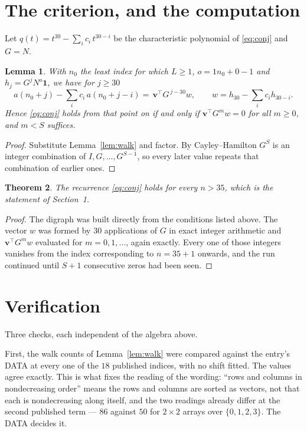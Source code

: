 \documentclass[11pt,a4paper]{article}
\theoremstyle{plain}
\newtheorem{theorem}{Theorem}
\newtheorem{lemma}[theorem]{Lemma}
\theoremstyle{definition}
\begin{document}
\section{The criterion, and the computation}

Let $q(t)=t^{30}-\sum_i c_i\,t^{30-i}$ be the characteristic polynomial of
\eqref{eq:conj} and $G=N$.

\begin{lemma}\label{lem:crit}
With $n_0$ the least index for which $L\ge1$, $o=1n_0+0-1$ and
$h_j=G^{j}N^{o}\mathbf{1}$, we have for $j\ge30$
\[
a(n_0+j)-\sum_i c_i\,a(n_0+j-i)=\,\mathbf{v}^{\!\top}G^{\,j-30}w,
\qquad w=h_{30}-\sum_i c_ih_{30-i} .
\]
Hence \eqref{eq:conj} holds from that point on if and only if
$\mathbf{v}^{\!\top}G^{m}w=0$ for all $m\ge0$, and $m<S$ suffices.
\end{lemma}

\begin{proof}
Substitute Lemma~\ref{lem:walk} and factor. By Cayley--Hamilton $G^{S}$ is an integer
combination of $I,G,\dots,G^{S-1}$, so every later value repeats that combination of
earlier ones.
\end{proof}

\begin{theorem}
The recurrence \eqref{eq:conj} holds for every $n>35$, which is the statement of
Section~1.
\end{theorem}

\begin{proof}
The digraph was built directly from the conditions listed above. The vector $w$ was formed by
$30$ applications of $G$ in exact integer arithmetic and $\mathbf{v}^{\!\top}G^{m}w$
evaluated for $m=0,1,\dots$, again exactly. Every one of those integers vanishes from the
index corresponding to $n=35+1$ onwards, and the run continued until $S+1$ consecutive
zeros had been seen.
\end{proof}

\section{Verification}

Three checks, each independent of the algebra above.

First, the walk counts of Lemma~\ref{lem:walk} were compared against the entry's DATA at
every one of the $18$ published indices, with no shift fitted. The values agree exactly.
This is what fixes the reading of the wording: ``rows and columns in nondecreasing order''
means the rows and columns are sorted as vectors, not that each is nondecreasing along
itself, and the two readings already differ at the second published term --- $86$ against
$50$ for $2\times2$ arrays over $\{0,1,2,3\}$. The DATA decides it.
\end{document}
